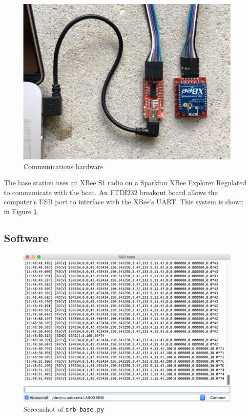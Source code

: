\documentclass[a4paper]{IEEEtran}
\begin{document}
\begin{figure}[h!]
\includegraphics[width=\columnwidth]{comms-hardware.jpg}
\caption{Communications hardware}
\label{commshardware}
\end{figure}

The base station uses an XBee S1 radio on a Sparkfun XBee Explorer Regulated to communicate with the boat. An FTDI232 breakout board allows the computer's USB port to interface with the XBee's UART. This system is shown in Figure \ref{commshardware}.

\subsection{Software}

\begin{figure}[h!]
\includegraphics[width=\columnwidth]{srb-base-screenshot.png}
\caption{Screenshot of \texttt{srb-base.py}}
\label{srbbase}
\end{figure}
\end{document}
